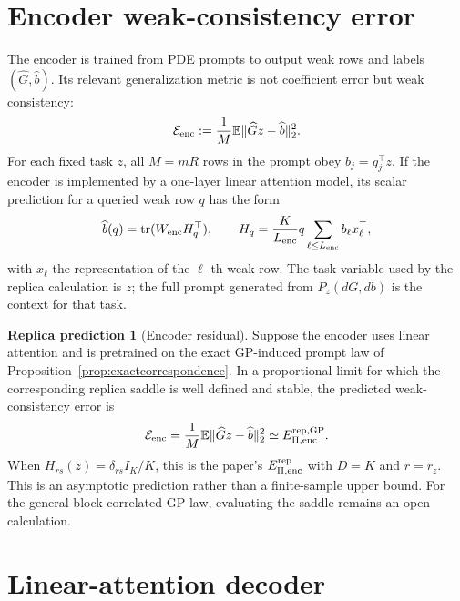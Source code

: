 \documentclass[11pt,a4paper]{article}
\theoremstyle{definition}
\newtheorem{prediction}{Replica prediction}
\newcommand{\E}{\mathbb E}
\newcommand{\wh}{\widehat}
\newcommand{\calE}{\mathcal E}
\newcommand{\tr}{\operatorname{tr}}
\begin{document}
\section{Encoder weak-consistency error}

The encoder is trained from PDE prompts to output weak rows and labels
$(\wh G,\wh b)$.  Its relevant generalization metric is not coefficient error
but weak consistency:
\[
    \calE_{\rm enc}
    :=
    \frac1M
    \E\|\wh Gz-\wh b\|_2^2 .
\]
For each fixed task $z$, all $M=mR$ rows in the prompt obey
$b_j=g_j^\top z$.  If the encoder is implemented by a one-layer linear
attention model, its scalar prediction for a queried weak row $q$ has the form
\[
    \wh b(q)
    =
    \tr(W_{\rm enc}H_q^\top),
    \qquad
    H_q
    =
    \frac{K}{L_{\rm enc}}
    q\sum_{\ell\le L_{\rm enc}} b_\ell x_\ell^\top ,
\]
with $x_\ell$ the representation of the $\ell$-th weak row.  The task variable
used by the replica calculation is $z$; the full prompt generated from
$P_z(dG,db)$ is the context for that task.

\begin{prediction}[Encoder residual]
\label{pred:encoder}
Suppose the encoder uses linear attention and is pretrained on the exact
GP-induced prompt law of Proposition~\ref{prop:exactcorrespondence}.  In a
proportional limit for which the corresponding replica saddle is well defined
and stable, the predicted weak-consistency error is
\[
    \calE_{\rm enc}
    =
    \frac1M\E\|\wh Gz-\wh b\|_2^2
    \simeq
    E_{\Pi,\rm enc}^{\rm rep,GP}.
\]
When \(H_{rs}(z)=\delta_{rs}I_K/K\), this is the paper's
$E_{\Pi,\rm enc}^{\rm rep}$ with $D=K$ and $r=r_z$.
This is an asymptotic prediction rather than a finite-sample upper bound.  For
the general block-correlated GP law, evaluating the saddle remains an open
calculation.
\end{prediction}

\section{Linear-attention decoder}
\end{document}
